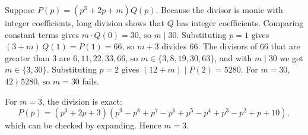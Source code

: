 Suppose $P(p)=(p^3+2p+m)Q(p)$. Because the divisor is monic with integer coefficients, long division shows that $Q$ has integer coefficients. Comparing constant terms gives $m\cdot Q(0)=30$, so $m\mid30$. Substituting $p=1$ gives $(3+m)\,Q(1)=P(1)=66$, so $m+3$ divides $66$. The divisors of $66$ that are greater than $3$ are $6,11,22,33,66$, so $m\in\{3,8,19,30,63\}$, and with $m\mid30$ we get $m\in\{3,30\}$. Substituting $p=2$ gives $(12+m)\mid P(2)=5280$. For $m=30$, $42\nmid5280$, so $m=30$ fails.

For $m=3$, the division is exact:
\[P(p)=(p^3+2p+3)\left(p^9-p^8+p^7-p^6+p^5-p^4+p^3-p^2+p+10\right),\]
which can be checked by expanding. Hence $m=\boxed{3}$.
